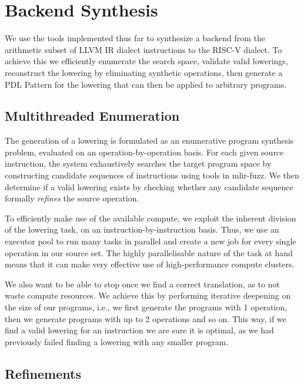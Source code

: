 \section{Backend Synthesis}

\label{backend synthesis}

We use the tools implemented thus far to synthesize a backend from the arithmetic subset of 
LLVM IR dialect instructions to the RISC-V dialect. To achieve this we efficiently
enumerate the search space, validate valid lowerings, reconstruct the lowering by eliminating
synthetic operations, then generate a PDL Pattern for the lowering that can then be applied to 
arbitrary programs.

\subsection{Multithreaded Enumeration}
The generation of a lowering is formulated as an enumerative program synthesis 
problem, evaluated on an operation-by-operation basis. For each given source instruction, 
the system exhaustively searches the target program space by constructing candidate sequences 
of instructions using tools in mlir-fuzz. We then determine if a valid lowering exists 
by checking whether any candidate sequence formally \emph{refines} the source operation.

To efficiently make use of the available compute, we exploit the inherent division of the lowering
task, on an instruction-by-instruction basis. Thus, we use an executor pool to run many tasks in 
parallel and create a new job for every single operation in our source set. The highly parallelisable
nature of the task at hand means that it can make very effective use of high-performance compute
clusters.

We also want to be able to stop once we find a correct translation, as to not waste compute resources. 
We achieve this by performing iterative deepening on the size of our programs, i.e., we 
first generate the programs with 1 operation, then we generate programs with up to 2 operations 
and so on. This way, if we find a valid lowering for an instruction we are sure it is optimal, 
as we had previously failed finding a lowering with any smaller program.


\subsection{Refinements}
\label{impl-refinements}

